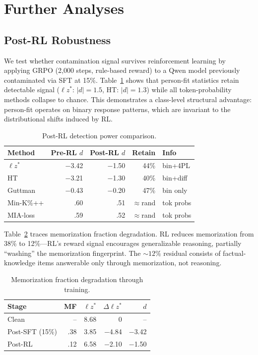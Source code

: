 \documentclass[11pt,twocolumn]{article}
\newcommand{\lzs}{\ensuremath{\ell z^*}}
\begin{document}
\section{Further Analyses}

\subsection{Post-RL Robustness}

We test whether contamination signal survives reinforcement learning by applying GRPO (2,000 steps, rule-based reward) to a Qwen model previously contaminated via SFT at 15\%. Table~\ref{tab:post_rl} shows that person-fit statistics retain detectable signal ($\lzs$: $|d| = 1.5$, HT: $|d| = 1.3$) while all token-probability methods collapse to chance. This demonstrates a class-level structural advantage: person-fit operates on binary response patterns, which are invariant to the distributional shifts induced by RL.

\begin{table}[t]
\centering
\caption{Post-RL detection power comparison.}
\label{tab:post_rl}
\footnotesize
\begin{tabular}{lrrrl}
\toprule
Method & Pre-RL $d$ & Post-RL $d$ & Retain & Info \\
\midrule
$\lzs$ & $-$3.42 & $-$1.50 & 44\% & bin+4PL \\
HT & $-$3.21 & $-$1.30 & 40\% & bin+diff \\
Guttman & $-$0.43 & $-$0.20 & 47\% & bin only \\
Min-K\%++ & .60 & .51 & $\approx$rand & tok probs \\
MIA-loss & .59 & .52 & $\approx$rand & tok probs \\
\bottomrule
\end{tabular}
\vspace{-0.3cm}
\end{table}

Table~\ref{tab:memo_degrad} traces memorization fraction degradation. RL reduces memorization from 38\% to 12\%---RL's reward signal encourages generalizable reasoning, partially ``washing'' the memorization fingerprint. The ${\sim}12\%$ residual consists of factual-knowledge items answerable only through memorization, not reasoning.

\begin{table}[t]
\centering
\caption{Memorization fraction degradation through training.}
\label{tab:memo_degrad}
\footnotesize
\begin{tabular}{lrrrr}
\toprule
Stage & MF & $\lzs$ & $\Delta\lzs$ & $d$ \\
\midrule
Clean & -- & 8.68 & 0 & -- \\
Post-SFT (15\%) & .38 & 3.85 & $-$4.84 & $-$3.42 \\
Post-RL & .12 & 6.58 & $-$2.10 & $-$1.50 \\
\bottomrule
\end{tabular}
\vspace{-0.3cm}
\end{table}
\end{document}
